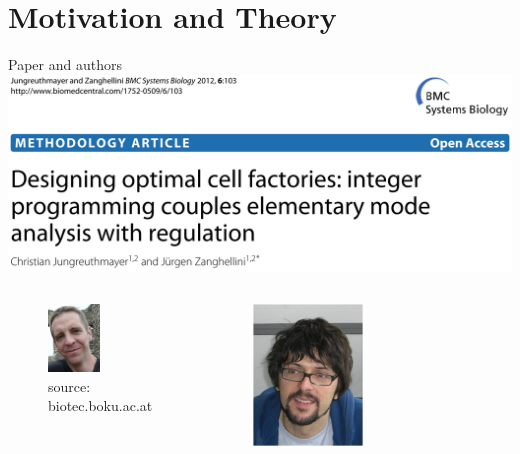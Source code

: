 \documentclass{beamer}
\begin{document}
\section{Motivation and Theory}
\begin{frame}{Paper and authors}
    \includegraphics[width=1\textwidth]{grafik/paper}
    \pause
    \begin{columns}
      \begin{center}
        \begin{figure}
         \includegraphics[width=0.5\textwidth]{grafik/jungreuthmayer} \\
         \tiny{source: biotec.boku.ac.at}
        \end{figure}
      \end{center}
      \begin{center}
        \begin{figure}
         \includegraphics[width=0.5\textwidth]{grafik/zanghellini} \\

\end{figure}
\end{center}
\end{columns}
\end{frame}
\end{document}
